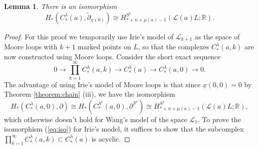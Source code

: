 \documentclass[a4paper]{article}
\newtheorem{lemma}[theorem]{Lemma}
\numberwithin{equation}{section}
\begin{document}
\begin{lemma}\label{lemma:def-0}
There is an isomorphism
\begin{equation}\label{eq:iso}
H_\ast\left(C_\ast^\lambda(a),\tilde{\partial}_{\underline{x}(0)}\right)\cong H_{\ast+n+\mu(a)-1}^{S^1}(\mathcal{L}(a)L;\mathbb{R}).
\end{equation}
\end{lemma}
\begin{proof}
For this proof we temporarily use Irie's model of $\mathcal{L}_{k+1}$ as the space of Moore loops with $k+1$ marked points on $L$, so that the complexes $C_\ast^\lambda(a,k)$ are now constructed using Moore loops. Consider the short exact sequence
\begin{equation}
0\rightarrow\prod_{k=1}^\infty C_\ast^\lambda(a,k)\rightarrow C_\ast^\lambda(a)\rightarrow C_\ast^\lambda(a,0)\rightarrow0.
\end{equation}
The advantage of using Irie's model of Moore loops is that since $\underline{x}(0,0)=0$ by Theorem \ref{theorem:chain} (iii), we have the isomorphism
\begin{equation}
H_\ast\left(C_\ast^\lambda(a,0),\partial\right)\cong H_\ast\left(C_\ast^{S^1}(a,0),\partial^{S^1}\right)\cong H_{\ast+n+\mu(a)-1}^{S^1}(\mathcal{L}(a)L;\mathbb{R}),
\end{equation} 
which otherwise doesn't hold for Wang's model of the space $\mathcal{L}_1$. To prove the isomorphism (\ref{eq:iso}) for Irie's model, it suffices to show that the subcomplex $\prod_{k=1}^\infty C_\ast^\lambda(a,k)\subset C_\ast^\lambda(a)$ is acyclic.


\end{proof}
\end{document}
